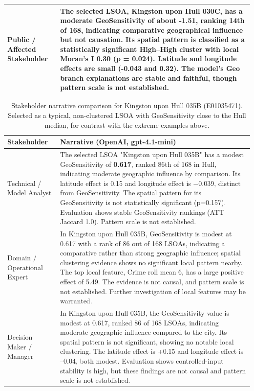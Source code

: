 \begin{table}[H]
\begin{tabularx}{\textwidth}{p{} X}
Public / Affected Stakeholder &
The selected LSOA, Kingston upon Hull 030C, has a moderate GeoSensitivity of about -1.51, ranking 14th of 168, indicating comparative geographical influence but not causation. Its spatial pattern is classified as a statistically significant High–High cluster with local Moran’s I 0.30 (p = 0.024). Latitude and longitude effects are small (-0.043 and 0.32). The model’s Geo branch explanations are stable and faithful, though pattern scale is not established. \\
\bottomrule
\end{tabularx}
\end{table}

\begin{table}[H]
\centering
\caption{Stakeholder narrative comparison for Kingston upon Hull 035B (E01035471). Selected as a typical, non-clustered LSOA with GeoSensitivity close to the Hull median, for contrast with the extreme examples above.}
\label{tab:stakeholder_narratives_typical}
\small
\begin{tabularx}{\textwidth}{p{} X}
\toprule
Stakeholder & Narrative (OpenAI, {\ttfamily gpt-4.1-mini}) \\
\midrule
Technical / Model Analyst &
The selected LSOA "Kingston upon Hull 035B" has a modest GeoSensitivity of \textbf{0.617}, ranked 86th of 168 in Hull, indicating moderate geographic influence by comparison. Its latitude effect is 0.15 and longitude effect is −0.039, distinct from GeoSensitivity. The spatial pattern for its GeoSensitivity is not statistically significant (p=0.157). Evaluation shows stable GeoSensitivity rankings (ATT Jaccard 1.0). Pattern scale is not established. \\
Domain / Operational Expert &
In Kingston upon Hull 035B, GeoSensitivity is modest at 0.617 with a rank of 86 out of 168 LSOAs, indicating a comparative rather than strong geographic influence; spatial clustering evidence shows no significant local pattern nearby. The top local feature, Crime roll mean 6, has a large positive effect of 5.49. The evidence is not causal, and pattern scale is not established. Further investigation of local features may be warranted. \\
Decision Maker / Manager &
In Kingston upon Hull 035B, the GeoSensitivity value is modest at 0.617, ranked 86 of 168 LSOAs, indicating moderate geographic influence compared to the city. Its spatial pattern is not significant, showing no notable local clustering. The latitude effect is +0.15 and longitude effect is –0.04, both modest. Evaluation shows controlled-input stability is high, but these findings are not causal and pattern scale is not established. \\

\end{tabularx}
\end{table}
